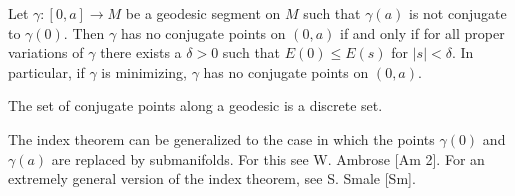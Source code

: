 \begin{corollary}[Jacobi]
  \label{cor:dc-ch11-2-9}
  Let $\gamma:[0,a]\to M$ be a geodesic segment on $M$ such that $\gamma(a)$ is not
  conjugate to $\gamma(0)$. Then $\gamma$ has no conjugate points on $(0,a)$ if and
  only if for all proper variations of $\gamma$ there exists a $\delta>0$ such that
  $E(0)\leq E(s)$ for $|s|<\delta$. In particular, if $\gamma$ is minimizing,
  $\gamma$ has no conjugate points on $(0,a)$.
\end{corollary}

\begin{corollary}
  \label{cor:dc-ch11-2-10}
  The set of conjugate points along a geodesic is a discrete set.
\end{corollary}

\begin{remark}[Remark 2.11]
  \label{rem:dc-ch11-2-11}
  The index theorem can be generalized to the case in which the points $\gamma(0)$
  and $\gamma(a)$ are replaced by submanifolds. For this see W. Ambrose [Am 2]. For
  an extremely general version of the index theorem, see S. Smale [Sm].
\end{remark}

